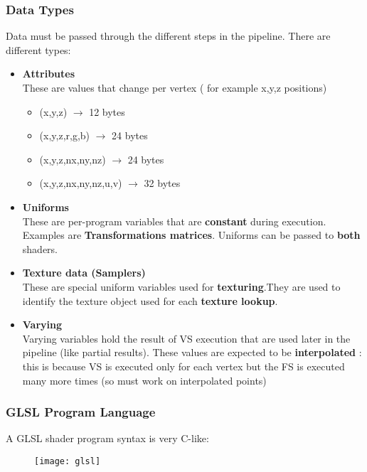 \subsubsection{Data Types}
Data must be passed through the different steps in the pipeline.
There are different types: 
\begin{itemize}
\item \textbf{Attributes}\\
These are values that change per vertex ( for example x,y,z positions)
\begin{itemize}
\item (x,y,z) $\to$ 12 bytes
\item (x,y,z,r,g,b) $\to$ 24 bytes
\item (x,y,z,nx,ny,nz) $\to$ 24 bytes
\item (x,y,z,nx,ny,nz,u,v) $\to$ 32 bytes
\end{itemize}
\item \textbf{Uniforms}\\
These are per-program variables that are \textbf{constant} during execution.
Examples are \textbf{Transformations matrices}. Uniforms can be passed to \textbf{both} shaders.
\item \textbf{Texture data (Samplers)}\\
These are special uniform variables used for \textbf{texturing}.They are used to identify the texture object used for each \textbf{texture lookup}.	
\item \textbf{Varying}\\
Varying variables hold the result of VS execution that are used later in the pipeline (like partial results). These values are expected to be \textbf{interpolated} : this is because VS is executed only for each vertex but the FS is executed many more times (so must work on interpolated points)
\end{itemize}

\subsubsection{GLSL Program Language}
A GLSL shader program syntax is very C-like:
 \begin{figure}[H]
 \centering
 \texttt{[image: glsl]} 
 \end{figure} 

